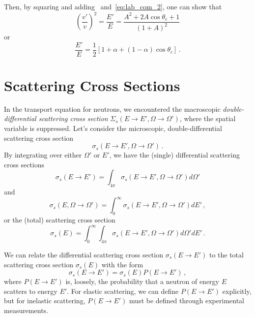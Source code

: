 Then, by squaring and adding ~and~\ref{eq:lab_com_2}, 
one can show that 
\begin{equation}
 \left( \frac{v'}{v}\right )^2 = \frac{E'}{E} = \frac{A^2 + 2A \cos \theta_c +1 }{(1+A)^2}
\end{equation}
or 
\begin{equation}
 \frac{E'}{E}  = \frac{1}{2} [1+\alpha + (1-\alpha)\cos \theta_c] \, .
\label{eq:scattered_neutron_energy_com}
\end{equation}

\section*{Scattering Cross Sections}

In the transport equation for neutrons, we encountered the 
macroscopic \emph{double-differential scattering cross 
section} $\Sigma_s(E\to E', \Omega\to \Omega')$, where 
the spatial variable is suppressed.   Let's consider 
the microscopic, double-differential scattering cross section
\begin{equation}
 \sigma_s(E\to E', \Omega\to \Omega') \, .
\end{equation}
By integrating over either $\Omega'$ or $E'$, we have 
the (single) differential scattering cross sections
\begin{equation}
 \sigma_s(E\to E') = \int_{4\pi} \sigma_s(E\to E', \Omega\to \Omega') d\Omega'
\end{equation}
and 
\begin{equation}
  \sigma_s(E, \Omega\to\Omega') = \int^{\infty}_0 \sigma_s(E\to E', \Omega\to \Omega') dE' \, ,
\end{equation}
or the (total) scattering cross section
\begin{equation}
 \sigma_s(E) = \int^{\infty}_0 \int_{4\pi} \sigma_s(E\to E', \Omega\to \Omega') d\Omega' dE' \, .
\end{equation}

We can relate the differential scattering cross section
$\sigma_s(E\to E')$ to the total scattering cross section
$\sigma_s(E)$ with the form 
\begin{equation}
  \sigma_s(E\to E') = \sigma_s(E)P(E\to E') \, ,
\end{equation}
where $P(E\to E')$ is, loosely, the probability 
that a neutron of energy $E$ scatters to energy $E'$.
For elastic scattering, we can define $P(E\to E')$ explicitly,
but for inelastic scattering, $P(E\to E')$ must be defined through 
experimental measurements.

